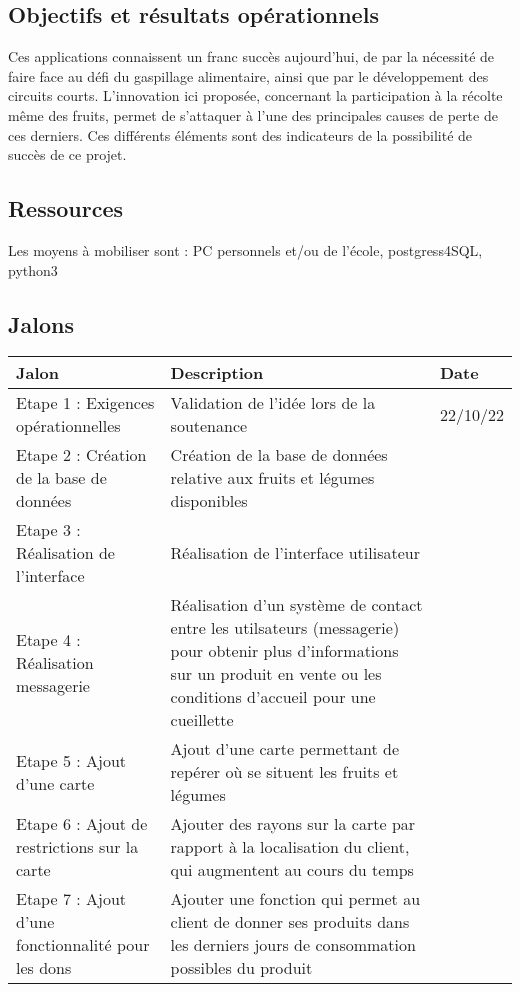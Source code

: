 \documentclass{article}
\begin{document}
\maketitle
\subsection{Objectifs et résultats opérationnels}

Ces applications connaissent un franc succès aujourd'hui, de par la nécessité de faire face au défi du gaspillage alimentaire, ainsi que par le développement des circuits courts. L'innovation ici proposée, concernant la participation à la récolte même des fruits, permet de s'attaquer à l'une des principales causes de perte de ces derniers. Ces différents éléments sont des indicateurs de la possibilité de succès de ce projet.

\subsection{Ressources}
Les moyens à mobiliser sont :
PC personnels et/ou de l'école, postgress4SQL, python3 


\subsection{Jalons}
\begin{center}
\begin{tabular}{|p{3cm}|p{5cm}|p{2cm}|} 
  \hline
  Jalon & Description & Date \\
  \hline
  Etape 1 : Exigences opérationnelles & Validation de l'idée lors de la soutenance & 22/10/22 \\
  \hline
  Etape 2 : Création de la base de données & Création de la base de données relative aux fruits et légumes disponibles &  \\
  \hline
  Etape 3 : Réalisation de l'interface & Réalisation de l'interface utilisateur & \\
  \hline
  Etape 4 : Réalisation messagerie & 
  Réalisation d'un système de contact entre les utilsateurs (messagerie) pour obtenir plus d'informations sur un produit en vente ou les conditions d'accueil pour une cueillette & \\
  \hline
  Etape 5 : Ajout d'une carte & Ajout d'une carte permettant de repérer où se situent les fruits et légumes & \\
  \hline
  Etape 6 : Ajout de restrictions sur la carte & Ajouter des rayons sur la carte par rapport à la localisation du client, qui augmentent au cours du temps & \\
  \hline
  Etape 7 : Ajout d'une fonctionnalité pour les dons & Ajouter une fonction qui permet au client de donner ses produits dans les derniers jours de consommation possibles du produit & \\ 
  \hline
\end{tabular}
\end{center}
\end{document}
